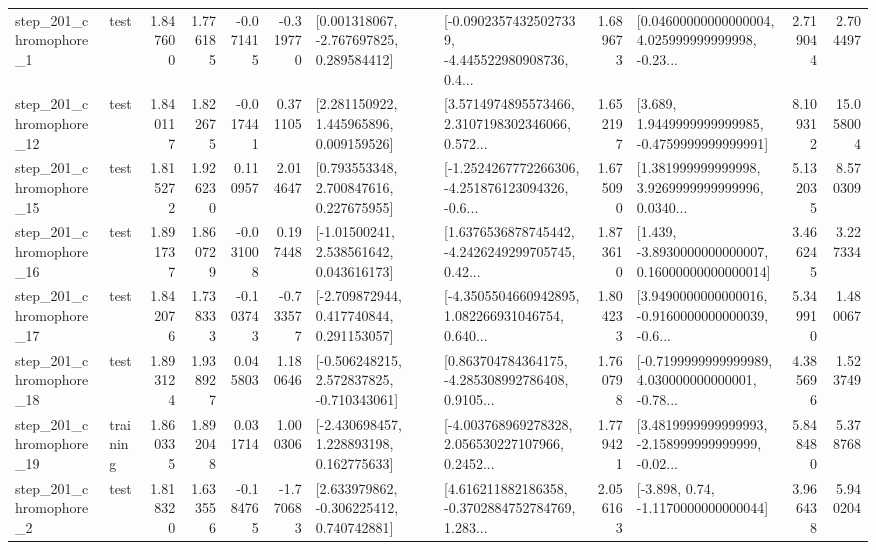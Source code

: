 \begin{tabular}{llrrrrllrlrr}
   step\_201\_chromophore\_1 &      test &      1.847600 &    1.776185 &     -0.071415 & -0.319770 &    [0.001318067, -2.767697825, 0.289584412] &  [-0.09023574325027339, -4.445522980908736, 0.4... &       1.689673 &  [0.04600000000000004, 4.025999999999998, -0.23... &            2.719044 &          2.704497 \\
  step\_201\_chromophore\_12 &      test &      1.840117 &    1.822675 &     -0.017441 &  0.371105 &     [2.281150922, 1.445965896, 0.009159526] &  [3.5714974895573466, 2.3107198302346066, 0.572... &       1.652197 &   [3.689, 1.9449999999999985, -0.4759999999999991] &            8.109312 &         15.058004 \\
  step\_201\_chromophore\_15 &      test &      1.815272 &    1.926230 &      0.110957 &  2.014647 &     [0.793553348, 2.700847616, 0.227675955] &  [-1.2524267772266306, -4.251876123094326, -0.6... &       1.675090 &  [1.381999999999998, 3.9269999999999996, 0.0340... &            5.132035 &          8.570309 \\
  step\_201\_chromophore\_16 &      test &      1.891737 &    1.860729 &     -0.031008 &  0.197448 &     [-1.01500241, 2.538561642, 0.043616173] &  [1.6376536878745442, -4.2426249299705745, 0.42... &       1.873610 &  [1.439, -3.8930000000000007, 0.16000000000000014] &            3.466245 &          3.227334 \\
  step\_201\_chromophore\_17 &      test &      1.842076 &    1.738333 &     -0.103743 & -0.733577 &    [-2.709872944, 0.417740844, 0.291153057] &  [-4.3505504660942895, 1.082266931046754, 0.640... &       1.804233 &  [3.9490000000000016, -0.9160000000000039, -0.6... &            5.349910 &          1.480067 \\
  step\_201\_chromophore\_18 &      test &      1.893124 &    1.938927 &      0.045803 &  1.180646 &   [-0.506248215, 2.572837825, -0.710343061] &  [0.863704784364175, -4.285308992786408, 0.9105... &       1.760798 &  [-0.7199999999999989, 4.030000000000001, -0.78... &            4.385696 &          1.523749 \\
  step\_201\_chromophore\_19 &  training &      1.860335 &    1.892048 &      0.031714 &  1.000306 &    [-2.430698457, 1.228893198, 0.162775633] &  [-4.003768969278328, 2.056530227107966, 0.2452... &       1.779421 &  [3.4819999999999993, -2.158999999999999, -0.02... &            5.848480 &          5.378768 \\
   step\_201\_chromophore\_2 &      test &      1.818320 &    1.633556 &     -0.184765 & -1.770683 &    [2.633979862, -0.306225412, 0.740742881] &  [4.616211882186358, -0.3702884752784769, 1.283... &       2.056163 &                [-3.898, 0.74, -1.1170000000000044] &            3.966438 &          5.940204 \\

\end{tabular}
